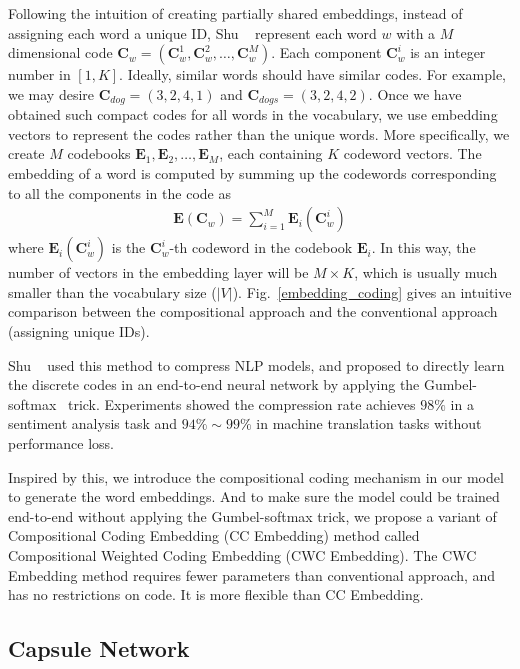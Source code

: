 \documentclass[times,twocolumn,final]{elsarticle}
\begin{document}
Following the intuition of creating partially shared embeddings, instead of assigning each word a unique ID, Shu \etal~\cite{shu2018compressing} represent each word $w$ with a $M$ dimensional code $\mathbf{C}_w=(\mathbf{C}_w^1,\mathbf{C}_w^2,\dots,\mathbf{C}_w^M)$. Each component $\mathbf{C}_w^i$ is an integer number in $[1,K]$. Ideally, similar words should have similar codes. For example, we may desire $\mathbf{C}_{dog}=(3,2,4,1)$ and $\mathbf{C}_{dogs}=(3,2,4,2)$. Once we have obtained such compact codes for all words in the vocabulary, we use embedding vectors to represent the codes rather than the unique words. More specifically, we create $M$ codebooks $\mathbf{E}_1,\mathbf{E}_2,\dots,\mathbf{E}_M$, each containing $K$ codeword vectors. The embedding of a word is computed by summing up the codewords corresponding to all the components in the code as
    \begin{align}
      \mathbf{E}(\mathbf{C}_w) = \sum_{i=1}^M \mathbf{E}_i(\mathbf{C}_w^i)
    \end{align}
where $\mathbf{E}_i(\mathbf{C}_w^i)$ is the $\mathbf{C}_w^i$-th codeword in the codebook $\mathbf{E}_i$. In this way, the number of vectors in the embedding layer will be $M \times K$, which is usually much smaller than the vocabulary size ($\vert V \vert$). Fig.~\ref{embedding_coding} gives an intuitive comparison between the compositional approach and the conventional approach (assigning unique IDs).

Shu \etal~\cite{shu2018compressing} used this method to compress NLP models, and proposed to directly learn the discrete codes in an end-to-end neural network by applying the Gumbel-softmax~\cite{maddison2017concrete, jang2017categorical} trick. Experiments showed the compression rate achieves $98\%$ in a sentiment analysis task and $94\% \sim 99\%$ in machine translation tasks without performance loss.

Inspired by this, we introduce the compositional coding mechanism in our model to generate the word embeddings. And to make sure the model could be trained end-to-end without applying the Gumbel-softmax trick, we propose a variant of Compositional Coding Embedding (CC Embedding) method called Compositional Weighted Coding Embedding (CWC Embedding). The CWC Embedding method requires fewer parameters than conventional approach, and has no restrictions on code. It is more flexible than CC Embedding.

\subsection{Capsule Network}
\end{document}
